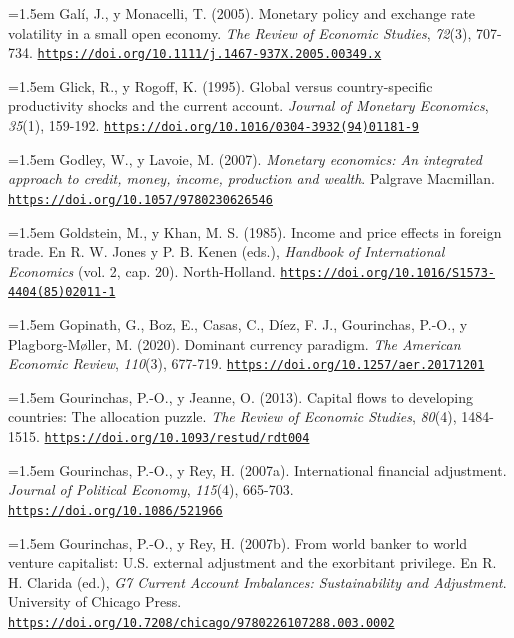 \documentclass[10pt,a4paper]{article}
\begin{document}
\noindent\hangindent=1.5em Galí, J., y Monacelli, T. (2005). Monetary policy and exchange rate volatility in a small open economy. \textit{The Review of Economic Studies}, \textit{72}(3), 707-734. \href{https://doi.org/10.1111/j.1467-937X.2005.00349.x}{\nolinkurl{https://doi.org/10.1111/j.1467-937X.2005.00349.x}}

\noindent\hangindent=1.5em Glick, R., y Rogoff, K. (1995). Global versus country-specific productivity shocks and the current account. \textit{Journal of Monetary Economics}, \textit{35}(1), 159-192. \href{https://doi.org/10.1016/0304-3932(94)01181-9}{\nolinkurl{https://doi.org/10.1016/0304-3932(94)01181-9}}

\noindent\hangindent=1.5em Godley, W., y Lavoie, M. (2007). \textit{Monetary economics: An integrated approach to credit, money, income, production and wealth}. Palgrave Macmillan. \href{https://doi.org/10.1057/9780230626546}{\nolinkurl{https://doi.org/10.1057/9780230626546}}

\noindent\hangindent=1.5em Goldstein, M., y Khan, M. S. (1985). Income and price effects in foreign trade. En R. W. Jones y P. B. Kenen (eds.), \textit{Handbook of International Economics} (vol. 2, cap. 20). North-Holland. \href{https://doi.org/10.1016/S1573-4404(85)02011-1}{\nolinkurl{https://doi.org/10.1016/S1573-4404(85)02011-1}}

\noindent\hangindent=1.5em Gopinath, G., Boz, E., Casas, C., Díez, F. J., Gourinchas, P.-O., y Plagborg-Møller, M. (2020). Dominant currency paradigm. \textit{The American Economic Review}, \textit{110}(3), 677-719. \href{https://doi.org/10.1257/aer.20171201}{\nolinkurl{https://doi.org/10.1257/aer.20171201}}

\noindent\hangindent=1.5em Gourinchas, P.-O., y Jeanne, O. (2013). Capital flows to developing countries: The allocation puzzle. \textit{The Review of Economic Studies}, \textit{80}(4), 1484-1515. \href{https://doi.org/10.1093/restud/rdt004}{\nolinkurl{https://doi.org/10.1093/restud/rdt004}}

\noindent\hangindent=1.5em Gourinchas, P.-O., y Rey, H. (2007a). International financial adjustment. \textit{Journal of Political Economy}, \textit{115}(4), 665-703. \href{https://doi.org/10.1086/521966}{\nolinkurl{https://doi.org/10.1086/521966}}

\noindent\hangindent=1.5em Gourinchas, P.-O., y Rey, H. (2007b). From world banker to world venture capitalist: U.S. external adjustment and the exorbitant privilege. En R. H. Clarida (ed.), \textit{G7 Current Account Imbalances: Sustainability and Adjustment}. University of Chicago Press. \href{https://doi.org/10.7208/chicago/9780226107288.003.0002}{\nolinkurl{https://doi.org/10.7208/chicago/9780226107288.003.0002}}
\end{document}

